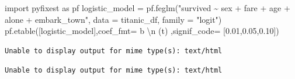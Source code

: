 \documentclass[
  letterpaper,
  DIV=11,
  numbers=noendperiod]{scrreprt}
\newenvironment{Shaded}{\begin{snugshade}}{\end{snugshade}}
\newcommand{\CharTok}[1]{\textcolor[rgb]{0.13,0.47,0.30}{#1}}
\newcommand{\FloatTok}[1]{\textcolor[rgb]{0.68,0.00,0.00}{#1}}
\newcommand{\ImportTok}[1]{\textcolor[rgb]{0.00,0.46,0.62}{#1}}
\newcommand{\NormalTok}[1]{\textcolor[rgb]{0.00,0.23,0.31}{#1}}
\newcommand{\OperatorTok}[1]{\textcolor[rgb]{0.37,0.37,0.37}{#1}}
\newcommand{\StringTok}[1]{\textcolor[rgb]{0.13,0.47,0.30}{#1}}
\begin{document}
\begin{Shaded}
\begin{Highlighting}[]
\ImportTok{import}\NormalTok{ pyfixest }\ImportTok{as}\NormalTok{ pf}
\NormalTok{logistic\_model }\OperatorTok{=}\NormalTok{ pf.feglm(}\StringTok{"survived \textasciitilde{} sex + fare + age + alone + embark\_town"}\NormalTok{, data }\OperatorTok{=}\NormalTok{ titanic\_df, family }\OperatorTok{=} \StringTok{"logit"}\NormalTok{)}
\NormalTok{pf.etable([logistic\_model],coef\_fmt}\OperatorTok{=} \StringTok{\textquotesingle{}b }\CharTok{\textbackslash{}n}\StringTok{ (t)\textquotesingle{}}
\NormalTok{          ,signif\_code}\OperatorTok{=}\NormalTok{ [}\FloatTok{0.01}\NormalTok{,}\FloatTok{0.05}\NormalTok{,}\FloatTok{0.10}\NormalTok{])}
\end{Highlighting}
\end{Shaded}

\begin{verbatim}
Unable to display output for mime type(s): text/html
\end{verbatim}

\begin{verbatim}
Unable to display output for mime type(s): text/html
\end{verbatim}
\end{document}
